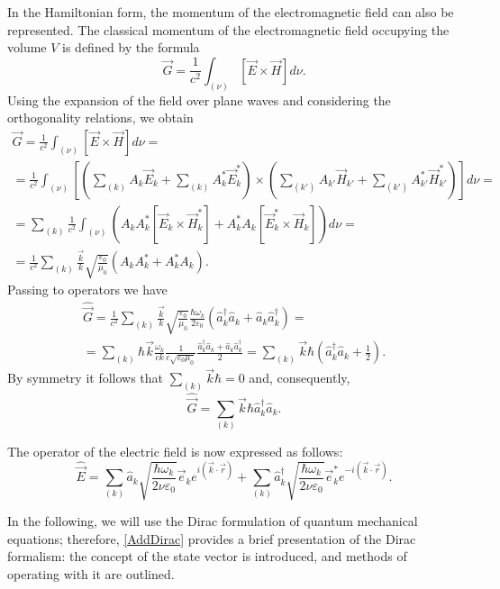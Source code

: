 In the Hamiltonian form, the momentum of the electromagnetic field can also be represented. The classical momentum of the electromagnetic field occupying the volume $V$ is defined by the formula 
\begin{equation}
\vec{G} = \frac{1}{c^2} \int_{(\nu)}
\left[\vec{E} \times \vec{H} \right] d \nu.
\label{eqCh1_task3_1}
\end{equation}
Using the expansion of the field over plane waves and considering the orthogonality relations, we obtain
\begin{eqnarray}
  \vec{G} = \frac{1}{c^2} \int_{(\nu)}
  \left[\vec{E} \times \vec{H} \right] d \nu =
  \nonumber \\
  =
  \frac{1}{c^2} \int_{(\nu)}
  \left[
    \left(\sum_{(k)} A_k \vec{E}_k +
    \sum_{(k)} A_k^\ast \vec{E}_k^\ast \right)
    \times \left(\sum_{(k')} A_{k'} \vec{H}_{k'} +
    \sum_{(k')} A_{k'}^\ast \vec{H}_{k'}^\ast \right)\right]
  d \nu =
  \nonumber \\
  =
  \sum_{(k)}
  \frac{1}{c^2} \int_{(\nu)}
  \left(
  A_k A_k^\ast \left[\vec{E}_k \times \vec{H}_k^\ast \right]
  +
  A_k^\ast A_k \left[\vec{E}_k^\ast \times \vec{H}_k \right]
  \right)
  d \nu =
  \nonumber \\
  =
  \frac{1}{c^2} \sum_{(k)} \frac{\vec{k}}{k}
  \sqrt{\frac{\varepsilon_0}{\mu_0}}
  \left(
  A_k A_k^\ast + A_k^\ast A_k
  \right).
  \nonumber
\end{eqnarray}
Passing to operators we have
\begin{eqnarray}
  \hat{\vec{G}} =
  \frac{1}{c^2} \sum_{(k)} \frac{\vec{k}}{k}
  \sqrt{\frac{\varepsilon_0}{\mu_0}}
  \frac{\hbar \omega_k}{2 \varepsilon_0}
  \left(\hat{a}_k^{\dag} \hat{a}_k + \hat{a}_k \hat{a}_k^{\dag}\right)
  =
  \nonumber \\
  =
  \sum_{(k)}
  \hbar
  \vec{k}
  \frac{\omega_k}{c k}
  \frac{1}{c \sqrt{\varepsilon_0 \mu_0}}
  \frac{\hat{a}_k^{\dag} \hat{a}_k + \hat{a}_k \hat{a}_k^{\dag}}{2}
  =
  \sum_{(k)} \vec{k} \hbar\left( \hat{a}_k^{\dag} \hat{a}_k +
\frac{1}{2} \right).
\nonumber
\end{eqnarray}
By symmetry it follows that $\sum_{(k)} \vec{k} \hbar = 0$ and, consequently, 
\begin{equation}
\hat{\vec{G}} = \sum_{(k)} \vec{k} \hbar \hat{a}_k^{\dag} \hat{a}_k.
\label{eqCh1_task3_2}
\end{equation}

The operator of the electric field is now expressed as follows:
\begin{equation}
\hat{\vec{E}} = \sum_{(k)} \hat{a}_k \sqrt{\frac{\hbar \omega_k}{2 \nu
    \varepsilon_0}} \vec{e}_k e^{i\left(\vec{k}\cdot\vec{r}\right)} +
\sum_{(k)} \hat{a}_k^{\dag} \sqrt{\frac{\hbar \omega_k}{2 \nu
    \varepsilon_0}} \vec{e}_k^{*} e^{-i\left(\vec{k}\cdot\vec{r}\right)}.
\end{equation}

In the following, we will use the Dirac formulation of quantum mechanical equations; therefore, \autoref{AddDirac} provides a brief presentation of the Dirac formalism: the concept of the state vector is introduced, and methods of operating with it are outlined.  
